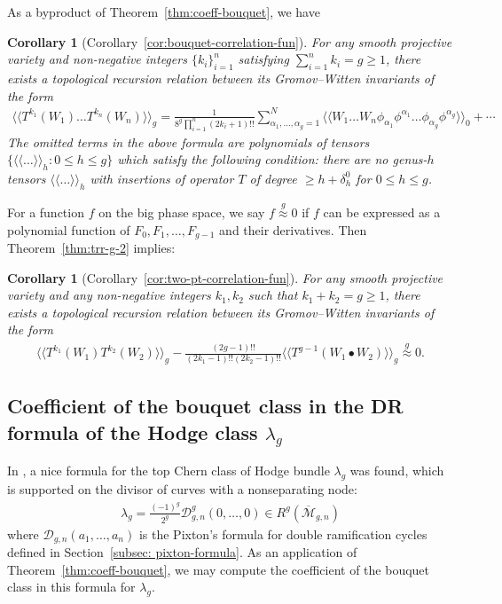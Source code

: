 \documentclass[12pt,reqno]{amsart}
\theoremstyle{plain}
\newtheorem{corollary}[theorem]{Corollary}
\theoremstyle{definition}
\theoremstyle{remark}
\begin{document}
As a byproduct of Theorem~\ref{thm:coeff-bouquet}, we have
\begin{corollary}[Corollary~\ref{cor:bouquet-correlation-fun}]
For any smooth projective variety and  non-negative integers $\{k_i\}_{i=1}^{n}$ satisfying $\sum_{i=1}^{n}k_i=g\geq1$, there exists a topological recursion relation between its Gromov--Witten invariants of the form
\begin{align*}
\langle\langle T^{k_1}(W_1)\ldots T^{k_n}(W_n)\rangle\rangle_g =\frac{1}{8^g \prod_{i=1}^{n}(2k_i+1)!!}\sum_{\alpha_1,\dots,\alpha_{g}=1}^{N}\langle\langle W_1\ldots W_n\phi_{\alpha_1}\phi^{\alpha_1}\ldots \phi_{\alpha_g}\phi^{\alpha_g}\rangle\rangle_0+\cdots
\end{align*}
 The omitted terms in the above formula are polynomials of tensors $\{\langle\langle\ldots\rangle\rangle_h: 0\leq h\leq g\}$ which satisfy the following condition: there are no
 genus-$h$ tensors $\langle\langle\ldots\rangle\rangle_h$  with insertions  of operator $T$  of degree $\geq h+\delta_{h}^0$ for
$0\leq h\leq g$.
\end{corollary}

For a function $f$  on the big phase space, we say $f\overset{g}{\approx}0$ if $f$ can be
expressed as a polynomial function of $F_0,F_1,\dots,F_{g-1}$ and their derivatives. Then
Theorem~\ref{thm:trr-g-2} implies:
\begin{corollary}[Corollary~\ref{cor:two-pt-correlation-fun}]
For any smooth projective variety and any non-negative integers $k_1, k_2$ such that $k_1+k_2=g\geq1$, 
 there exists a topological recursion relation between its Gromov--Witten invariants of the form
\begin{align*}
\langle\langle T^{k_1}(W_1)T^{k_2}(W_2)\rangle\rangle_g  -\frac{(2g-1)!!}{(2k_1-1)!! (2k_2-1)!!}\langle\langle T^{g-1}(W_1\bullet W_2)\rangle\rangle_g\overset{g}{\approx}0.  
\end{align*}
\end{corollary}

\subsection{Coefficient of the bouquet class  in the DR formula of the Hodge class $\lambda_g$}

In \cite{janda2017double}, a nice formula
for the  top Chern class of Hodge bundle $\lambda_g$ was found, which is supported on the divisor of curves with a nonseparating node:
\begin{align*}
\lambda_g=\frac{(-1)^g}{2^g} \mathcal{D}_{g,n}^{g}(0,\dots,0) \in R^{g}(\overline{\mathcal{M}}_{g,n})
\end{align*}
where $\mathcal{D}_{g,n}(a_1,\dots,a_n)$ is the Pixton's formula for double ramification cycles defined in Section~\ref{subsec: pixton-formula}. 
As an application of Theorem~\ref{thm:coeff-bouquet}, we may compute the coefficient of the bouquet class in this formula for $\lambda_g$.
\end{document}
